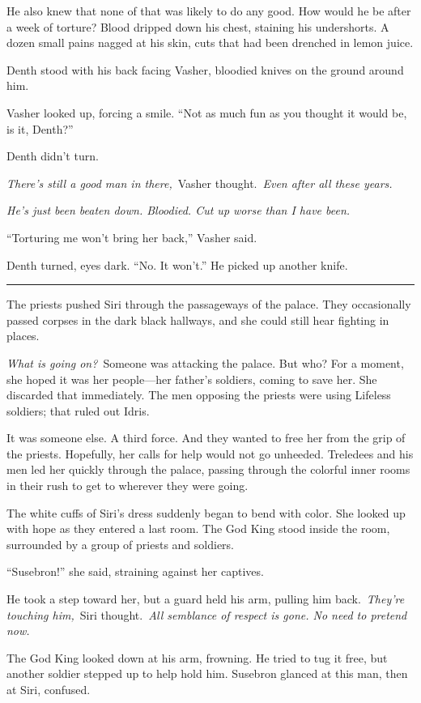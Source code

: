 He also knew that none of that was likely to do any good. How would he be after a week of torture? Blood dripped down his chest, staining his undershorts. A dozen small pains nagged at his skin, cuts that had been drenched in lemon juice.

Denth stood with his back facing Vasher, bloodied knives on the ground around him.

Vasher looked up, forcing a smile. “Not as much fun as you thought it would be, is it, Denth?”

Denth didn’t turn.

\textit{There’s still a good man in there,}~Vasher thought.~\textit{Even after all these years.}

\textit{He’s just been beaten down. Bloodied. Cut up worse than I have been.}

“Torturing me won’t bring her back,” Vasher said.

Denth turned, eyes dark. “No. It won’t.” He picked up another knife.

\bigskip \hrule \bigskip

The priests pushed Siri through the passageways of the palace. They occasionally passed corpses in the dark black hallways, and she could still hear fighting in places.

\textit{What is going on?}~Someone was attacking the palace. But who? For a moment, she hoped it was her people—her father’s soldiers, coming to save her. She discarded that immediately. The men opposing the priests were using Lifeless soldiers; that ruled out Idris.

It was someone else. A third force. And they wanted to free her from the grip of the priests. Hopefully, her calls for help would not go unheeded. Treledees and his men led her quickly through the palace, passing through the colorful inner rooms in their rush to get to wherever they were going.

The white cuffs of Siri’s dress suddenly began to bend with color. She looked up with hope as they entered a last room. The God King stood inside the room, surrounded by a group of priests and soldiers.

“Susebron!” she said, straining against her captives.

He took a step toward her, but a guard held his arm, pulling him back.~\textit{They’re touching him,}~Siri thought.~\textit{All semblance of respect is gone. No need to pretend now.}

The God King looked down at his arm, frowning. He tried to tug it free, but another soldier stepped up to help hold him. Susebron glanced at this man, then at Siri, confused.

